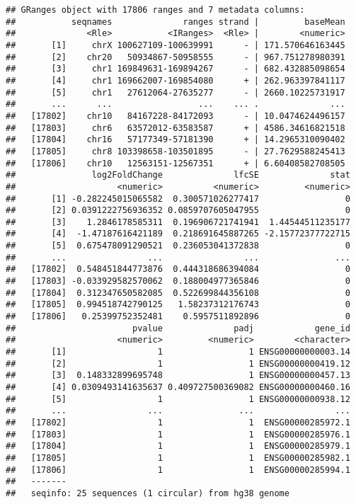 \documentclass[
]{article}
\begin{document}
\begin{verbatim}
## GRanges object with 17806 ranges and 7 metadata columns:
##           seqnames              ranges strand |         baseMean
##              <Rle>           <IRanges>  <Rle> |        <numeric>
##       [1]     chrX 100627109-100639991      - | 171.570646163445
##       [2]    chr20   50934867-50958555      - | 967.751278980391
##       [3]     chr1 169849631-169894267      - | 682.432885098654
##       [4]     chr1 169662007-169854080      + | 262.963397841117
##       [5]     chr1   27612064-27635277      - | 2660.10225731917
##       ...      ...                 ...    ... .              ...
##   [17802]    chr10   84167228-84172093      - | 10.0474624496157
##   [17803]     chr6   63572012-63583587      + | 4586.34616821518
##   [17804]    chr16   57177349-57181390      + | 14.2965310090402
##   [17805]     chr8 103398658-103501895      - | 27.7629588245413
##   [17806]    chr10   12563151-12567351      + | 6.60408582708505
##               log2FoldChange              lfcSE              stat
##                    <numeric>          <numeric>         <numeric>
##       [1] -0.282245015065582  0.300571026277417                 0
##       [2] 0.0391222756936352 0.0859707605047955                 0
##       [3]    1.2846178585311  0.196906721741941  1.44544511235177
##       [4]  -1.47187616421189  0.218691645887265 -2.15772377722715
##       [5]  0.675478091290521  0.236053041372838                 0
##       ...                ...                ...               ...
##   [17802]  0.548451844773876  0.444318686394084                 0
##   [17803] -0.033929582570062  0.188004977365846                 0
##   [17804]  0.312347650582085  0.522699844356108                 0
##   [17805]  0.994518742790125   1.58237312176743                 0
##   [17806]   0.25399752352481    0.5957511892896                 0
##                       pvalue              padj            gene_id
##                    <numeric>         <numeric>        <character>
##       [1]                  1                 1 ENSG00000000003.14
##       [2]                  1                 1 ENSG00000000419.12
##       [3]  0.148332899695748                 1 ENSG00000000457.13
##       [4] 0.0309493141635637 0.409727500369082 ENSG00000000460.16
##       [5]                  1                 1 ENSG00000000938.12
##       ...                ...               ...                ...
##   [17802]                  1                 1  ENSG00000285972.1
##   [17803]                  1                 1  ENSG00000285976.1
##   [17804]                  1                 1  ENSG00000285979.1
##   [17805]                  1                 1  ENSG00000285982.1
##   [17806]                  1                 1  ENSG00000285994.1
##   -------
##   seqinfo: 25 sequences (1 circular) from hg38 genome
\end{verbatim}
\end{document}
